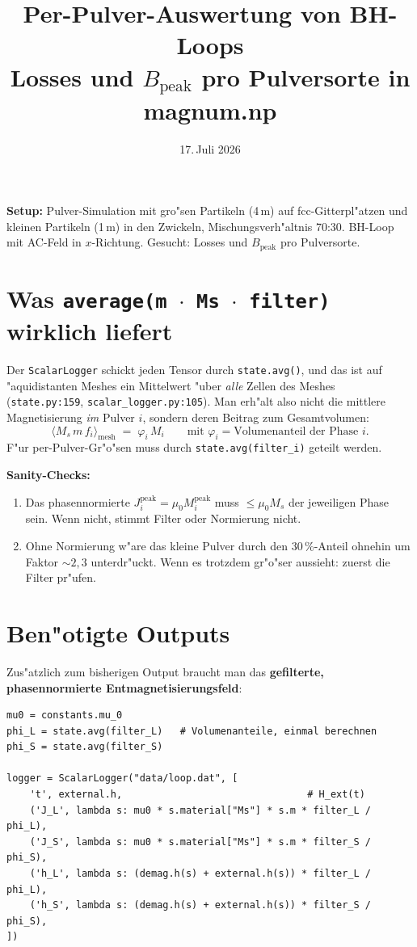 \documentclass[11pt,a4paper]{article}
\title{\color{kaminrot}Per-Pulver-Auswertung von BH-Loops\\
\large Losses und $B_\mathrm{peak}$ pro Pulversorte in magnum.np}
\author{}
\date{17.\,Juli 2026}
\begin{document}
\maketitle

\noindent\textbf{Setup:} Pulver-Simulation mit gro"sen Partikeln (4\,\textmu m) auf fcc-Gitterpl"atzen und kleinen Partikeln (1\,\textmu m) in den Zwickeln, Mischungsverh"altnis 70:30. BH-Loop mit AC-Feld in $x$-Richtung. Gesucht: Losses und $B_\mathrm{peak}$ pro Pulversorte.

\section{Was \texttt{average(m $\cdot$ Ms $\cdot$ filter)} wirklich liefert}

Der \texttt{ScalarLogger} schickt jeden Tensor durch \texttt{state.avg()}, und das ist auf "aquidistanten Meshes ein Mittelwert "uber \emph{alle} Zellen des Meshes (\texttt{state.py:159}, \texttt{scalar\_logger.py:105}). Man erh"alt also nicht die mittlere Magnetisierung \emph{im} Pulver $i$, sondern deren Beitrag zum Gesamtvolumen:
\begin{equation}
\langle M_s\, m\, f_i \rangle_\text{mesh} \;=\; \varphi_i \, M_i
\qquad\text{mit } \varphi_i = \text{Volumenanteil der Phase } i .
\end{equation}
F"ur per-Pulver-Gr"o"sen muss durch \texttt{state.avg(filter\_i)} geteilt werden.

\textbf{Sanity-Checks:}
\begin{enumerate}
  \item Das phasennormierte $J_i^\text{peak} = \mu_0 M_i^\text{peak}$ muss $\le \mu_0 M_s$ der jeweiligen Phase sein. Wenn nicht, stimmt Filter oder Normierung nicht.
  \item Ohne Normierung w"are das kleine Pulver durch den 30\,\%-Anteil ohnehin um Faktor ${\sim}2{,}3$ unterdr"uckt. Wenn es trotzdem gr"o"ser aussieht: zuerst die Filter pr"ufen.
\end{enumerate}

\section{Ben"otigte Outputs}

Zus"atzlich zum bisherigen Output braucht man das \textbf{gefilterte, phasennormierte Entmagnetisierungsfeld}:

\begin{lstlisting}
mu0 = constants.mu_0
phi_L = state.avg(filter_L)   # Volumenanteile, einmal berechnen
phi_S = state.avg(filter_S)

logger = ScalarLogger("data/loop.dat", [
    't', external.h,                                # H_ext(t)
    ('J_L', lambda s: mu0 * s.material["Ms"] * s.m * filter_L / phi_L),
    ('J_S', lambda s: mu0 * s.material["Ms"] * s.m * filter_S / phi_S),
    ('h_L', lambda s: (demag.h(s) + external.h(s)) * filter_L / phi_L),
    ('h_S', lambda s: (demag.h(s) + external.h(s)) * filter_S / phi_S),
])
\end{lstlisting}
\end{document}
